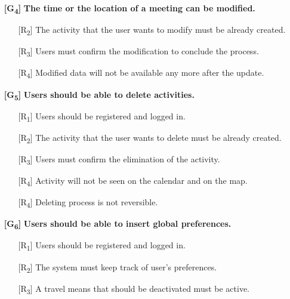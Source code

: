 \documentclass[12pt,titlepage]{article}
\begin{document}
\begin{itemize}
\begin{itemize}
\end{itemize}
\item[\textbf{ {[G\textsubscript{4}]}}]	\textbf{	The time or the location of a meeting can be modified.}
\begin{itemize}
\item[{[R\textsubscript{2}]}] The activity that the user wants to modify must be already created.
\item[{[R\textsubscript{3}]}] Users must confirm the modification to conclude the process.
\item[{[R\textsubscript{4}]}] Modified data will not be available any more after the update.
\end{itemize}
\item[\textbf{ {[G\textsubscript{5}]}}]	\textbf{		Users should be able to delete activities.}
\begin{itemize}
\item[{[R\textsubscript{1}]}]  Users should be registered and logged in.
\item[{[R\textsubscript{2}]}] The activity that the user wants to delete must be already created.
\item[{[R\textsubscript{3}]}] Users must confirm the elimination of the activity.
\item[{[R\textsubscript{4}]}] Activity will not be seen on the calendar and on the map.
\item[{[R\textsubscript{4}]}] Deleting process is not reversible.
\end{itemize}
\item[\textbf{ {[G\textsubscript{6}]}}]	\textbf{	Users should be able to insert global preferences.}
\begin{itemize}
\item[{[R\textsubscript{1}]}]  Users should be registered and logged in.
\item[{[R\textsubscript{2}]}]  The system must keep track of user's preferences.
\item[{[R\textsubscript{3}]}] A travel means that should be deactivated must be active.

\end{itemize}
\end{itemize}
\end{document}
